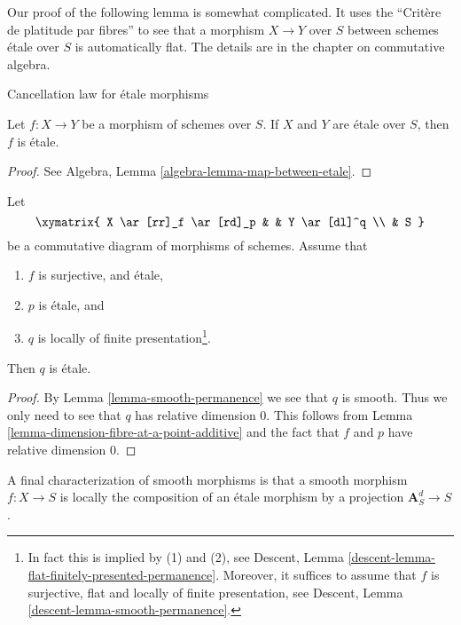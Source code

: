 \noindent
Our proof of the following lemma is somewhat complicated.
It uses the ``Crit\`ere de platitude par fibres'' to see that
a morphism $X \to Y$ over $S$ between schemes \'etale over $S$
is automatically flat. The details are in the chapter on commutative algebra.

\begin{lemma}
\label{lemma-etale-permanence}
\begin{slogan}
Cancellation law for \'etale morphisms
\end{slogan}
Let $f : X \to Y$ be a morphism of schemes over $S$.
If $X$ and $Y$ are \'etale over $S$, then
$f$ is \'etale.
\end{lemma}

\begin{proof}
See Algebra, Lemma \ref{algebra-lemma-map-between-etale}.
\end{proof}

\begin{lemma}
\label{lemma-etale-permanence-two}
Let
$$
\xymatrix{
X \ar[rr]_f \ar[rd]_p & &
Y \ar[dl]^q \\
& S
}
$$
be a commutative diagram of morphisms of schemes. Assume that
\begin{enumerate}
\item $f$ is surjective, and \'etale,
\item $p$ is \'etale, and
\item $q$ is locally of finite presentation\footnote{In fact this
is implied by (1) and (2), see
Descent, Lemma \ref{descent-lemma-flat-finitely-presented-permanence}.
Moreover, it suffices to assume that $f$ is surjective, flat and
locally of finite presentation, see
Descent, Lemma \ref{descent-lemma-smooth-permanence}.}.
\end{enumerate}
Then $q$ is \'etale.
\end{lemma}

\begin{proof}
By Lemma \ref{lemma-smooth-permanence} we see that $q$ is smooth.
Thus we only need to see that $q$ has relative dimension $0$.
This follows from Lemma \ref{lemma-dimension-fibre-at-a-point-additive}
and the fact that $f$ and $p$ have relative dimension $0$.
\end{proof}

\noindent
A final characterization of smooth morphisms is that a smooth morphism
$f : X \to S$ is locally the composition of an \'etale morphism by a projection
$\mathbf{A}_S^d \to S$.

